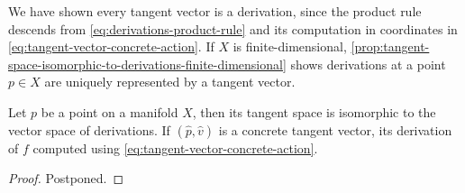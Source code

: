 \documentclass[../main-manifolds.tex]{subfiles}
\begin{document}
%
%
We have shown every tangent vector is a derivation, since the product rule descends from \cref{eq:derivations-product-rule} and its computation in coordinates in \cref{eq:tangent-vector-concrete-action}.  If $X$ is finite-dimensional, \cref{prop:tangent-space-isomorphic-to-derivations-finite-dimensional} shows derivations at a point $p\in X$ are uniquely represented by a tangent vector.
%
%
\begin{wts}\label{prop:tangent-space-isomorphic-to-derivations-finite-dimensional}
Let $p$ be a point on a manifold $X$, then its tangent space is isomorphic to the vector space of derivations. If $(\hat{p},\hat{v})$ is a concrete tangent vector, its derivation of $f$ computed using \cref{eq:tangent-vector-concrete-action}.
\end{wts}
\begin{proof}
    Postponed.
\end{proof}


\end{document}
